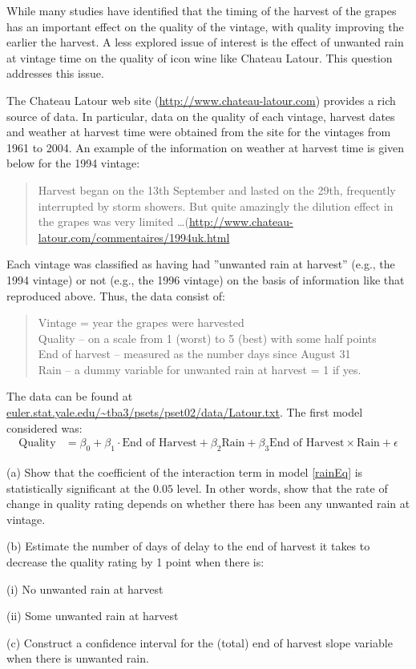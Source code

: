 \documentclass[12pt]{article}
\begin{document}
While many studies have identified that the timing of the harvest of the grapes has an important effect on the quality of the vintage, with quality improving the earlier the harvest. A less explored issue of interest is the effect of unwanted rain at vintage time on the quality of icon wine like Chateau Latour. This question addresses this issue.

The Chateau Latour web site (\url{http://www.chateau-latour.com}) provides a rich source of data. In particular, data on the quality of each vintage, harvest dates and weather at harvest time were obtained from the site for the vintages from 1961 to 2004. An example of the information on weather at harvest time is given below for the 1994 vintage:
\begin{quote}
Harvest began on the 13th September and lasted on the 29th, frequently interrupted by storm showers. But quite amazingly the dilution effect in the grapes was very limited \ldots (\url{http://www.chateau-latour.com/commentaires/1994uk.html}
\end{quote}
Each vintage was classified as having had ''unwanted rain at harvest'' (e.g., the 1994 vintage) or not (e.g., the 1996 vintage) on the basis of information like that reproduced above. Thus, the data consist of:
\begin{quote}
Vintage = year the grapes were harvested \\
Quality – on a scale from 1 (worst) to 5 (best) with some half points \\
End of harvest – measured as the number days since August 31 \\
Rain – a dummy variable for unwanted rain at harvest = 1 if yes.
\end{quote}
The data can be found at \url{euler.stat.yale.edu/~tba3/psets/pset02/data/Latour.txt}. The first model considered was:
\begin{align}
\text{Quality} &= \beta_0 +\beta_1 \cdot \text{End of Harvest} + \beta_2 \text{Rain}
  + \beta_3 \text{End of Harvest} \times \text{Rain} + \epsilon \label{rainEq}
\end{align}

(a) Show that the coefficient of the interaction term in model \ref{rainEq} is statistically significant at the $0.05$ level. In other words, show that the rate of change in quality rating depends on whether there has been any unwanted rain at vintage.

(b) Estimate the number of days of delay to the end of harvest it takes to decrease the quality rating by 1 point when there is:

\quad (i) No unwanted rain at harvest

\quad (ii) Some unwanted rain at harvest

(c) Construct a confidence interval for the (total) end of harvest slope variable when there is unwanted rain.
\end{document}
